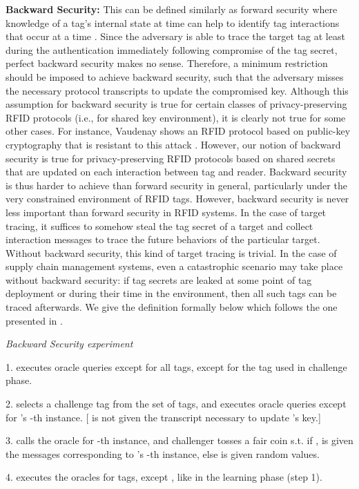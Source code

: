 \documentclass{easychair}
\begin{document}
\textbf{Backward Security:} This can be defined similarly as forward security where knowledge of a tag's internal state at time 
can help to identify tag interactions that occur at a time  \cite{lk,sm:bp}. Since the adversary is able to trace the target tag at least during the authentication immediately
following compromise of the tag secret, perfect backward security makes no sense. Therefore, a minimum restriction should be imposed to achieve backward security, such that the adversary misses the necessary protocol transcripts to update the compromised key. Although this assumption for backward security is true for certain classes of privacy-preserving RFID protocols (i.e., for shared key environment)\cite{lk,sm:bp}, it is clearly not true for some other cases. For instance, Vaudenay shows an RFID protocol based on public-key cryptography that is resistant to this attack \cite{vaud:asia}. However, our notion of backward security is true for privacy-preserving RFID protocols based on shared secrets that are updated on each interaction between tag and reader. Backward security is thus harder to achieve than forward security in general, particularly under the very constrained environment of RFID tags. However, backward security is never less important than forward security in RFID systems. In
the case of target tracing, it suffices to somehow
steal the tag secret of a target 
and collect interaction messages to trace the future behaviors of the particular target. Without backward security, this kind of target tracing is trivial. In the case of supply chain management systems, even a catastrophic scenario may take place without backward security: if tag secrets are leaked at some point of tag deployment or during their time in the environment, then all such tags can be traced afterwards. We give the definition formally below which follows the one presented in \cite{fordsec}.

\textit{Backward Security experiment}


1.  executes oracle queries except  for all  tags, except for the tag  used in challenge phase.

2.  selects a challenge tag  from the set of  tags, and executes oracle queries except  for 's -th instance. [ is not given the transcript necessary to update 's key.]

3.  calls the oracle  for -th instance, and challenger  tosses a fair coin  s.t. if ,  is given the messages corresponding to 's -th instance, else is given random values.

4.  executes the oracles for  tags, except , like in the learning phase (step 1).
\end{document}
